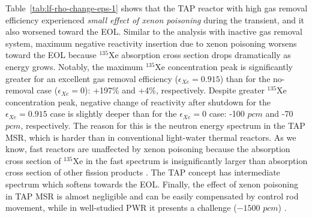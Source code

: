 Table~\ref{tab:lf-rho-change-eps-1} shows that the \gls{TAP} reactor with 
high gas removal efficiency experienced \emph{small effect of xenon poisoning} 
during the transient, and it also worsened toward the \gls{EOL}. Similar to 
the analysis with inactive gas removal 
system, maximum negative reactivity insertion due to xenon poisoning worsens 
toward the \gls{EOL} because $^{135}$Xe absorption cross section drops 
dramatically as energy grows. Notably, 
the maximum $^{135}$Xe concentration peak is significantly greater for an 
excellent gas removal efficiency ($\epsilon_{Xe}=0.915$) than for the 
no-removal case ($\epsilon_{Xe}=0$): +197\% and +4\%, respectively. Despite 
greater $^{135}$Xe concentration peak, negative change of reactivity after 
shutdown for the $\epsilon_{Xe}=0.915$ case is slightly deeper than for the 
$\epsilon_{Xe}=0$ case: -100 $pcm$ and -70 $pcm$, respectively. The reason for 
this is the neutron energy spectrum in the \gls{TAP} \gls{MSR}, which is 
harder than in conventional light-water thermal reactors. As we know, 
fast reactors are unaffected by xenon poisoning because the absorption cross 
section of $^{135}$Xe in the fast spectrum is insignificantly larger than 
absorption cross section of other fission products \cite{bell_nuclear_1970, 
svanstrom_load_2016-2}. The \gls{TAP} concept has intermediate spectrum which 
softens towards the \gls{EOL}. Finally, the effect of xenon 
poisoning in \gls{TAP} \gls{MSR} is almost negligible and can be easily 
compensated by control rod movement, while in well-studied \gls{PWR} it 
presents a challenge ($-1500$ $pcm$) \cite{rykhlevskii_impact_2019}.
